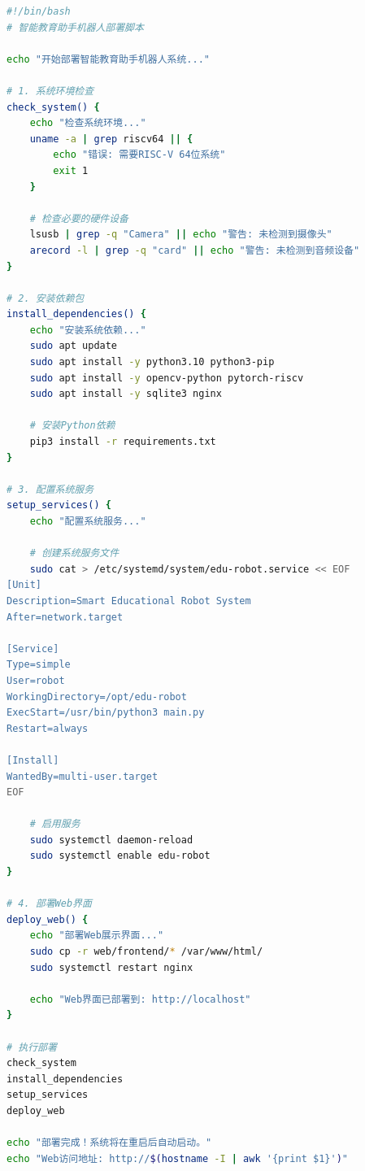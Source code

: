 \documentclass[12pt,a4paper]{article}
\begin{document}
\begin{lstlisting}[language=bash, caption=系统部署脚本]
#!/bin/bash
# 智能教育助手机器人部署脚本

echo "开始部署智能教育助手机器人系统..."

# 1. 系统环境检查
check_system() {
    echo "检查系统环境..."
    uname -a | grep riscv64 || {
        echo "错误: 需要RISC-V 64位系统"
        exit 1
    }
    
    # 检查必要的硬件设备
    lsusb | grep -q "Camera" || echo "警告: 未检测到摄像头"
    arecord -l | grep -q "card" || echo "警告: 未检测到音频设备"
}

# 2. 安装依赖包
install_dependencies() {
    echo "安装系统依赖..."
    sudo apt update
    sudo apt install -y python3.10 python3-pip
    sudo apt install -y opencv-python pytorch-riscv
    sudo apt install -y sqlite3 nginx
    
    # 安装Python依赖
    pip3 install -r requirements.txt
}

# 3. 配置系统服务
setup_services() {
    echo "配置系统服务..."
    
    # 创建系统服务文件
    sudo cat > /etc/systemd/system/edu-robot.service << EOF
[Unit]
Description=Smart Educational Robot System
After=network.target

[Service]
Type=simple
User=robot
WorkingDirectory=/opt/edu-robot
ExecStart=/usr/bin/python3 main.py
Restart=always

[Install]
WantedBy=multi-user.target
EOF
    
    # 启用服务
    sudo systemctl daemon-reload
    sudo systemctl enable edu-robot
}

# 4. 部署Web界面
deploy_web() {
    echo "部署Web展示界面..."
    sudo cp -r web/frontend/* /var/www/html/
    sudo systemctl restart nginx
    
    echo "Web界面已部署到: http://localhost"
}

# 执行部署
check_system
install_dependencies
setup_services   
deploy_web

echo "部署完成！系统将在重启后自动启动。"
echo "Web访问地址: http://$(hostname -I | awk '{print $1}')"
\end{lstlisting}
\end{document}
